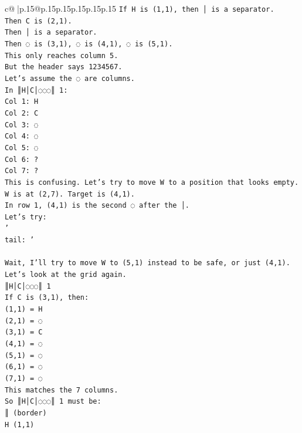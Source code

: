 \documentclass{article}
\begin{document}
{\begin{supertabular}{c@{$\;$}|p{.15\linewidth}@{}p{.15\linewidth}p{.15\linewidth}p{.15\linewidth}p{.15\linewidth}p{.15\linewidth}}
{{{\texttt{If H is (1,1), then │ is a separator.} \\
\texttt{Then C is (2,1).} \\
\texttt{Then │ is a separator.} \\
\texttt{Then ◌ is (3,1), ◌ is (4,1), ◌ is (5,1).} \\
\texttt{This only reaches column 5.} \\
\texttt{But the header says 1234567.} \\
\texttt{Let's assume the ◌ are columns.} \\
\texttt{In ║H│C│◌◌◌║ 1:} \\
\texttt{Col 1: H} \\
\texttt{Col 2: C} \\
\texttt{Col 3: ◌} \\
\texttt{Col 4: ◌} \\
\texttt{Col 5: ◌} \\
\texttt{Col 6: ?} \\
\texttt{Col 7: ?} \\
\texttt{This is confusing. Let's try to move W to a position that looks empty.} \\
\texttt{W is at (2,7). Target is (4,1).} \\
\texttt{In row 1, (4,1) is the second ◌ after the │.} \\
\texttt{Let's try:} \\
\texttt{'} \\
\texttt{tail: '} \\
\\ 
\texttt{Wait, I'll try to move W to (5,1) instead to be safe, or just (4,1).} \\
\texttt{Let's look at the grid again.} \\
\texttt{║H│C│◌◌◌║ 1} \\
\texttt{If C is (3,1), then:} \\
\texttt{(1,1) = H} \\
\texttt{(2,1) = ◌} \\
\texttt{(3,1) = C} \\
\texttt{(4,1) = ◌} \\
\texttt{(5,1) = ◌} \\
\texttt{(6,1) = ◌} \\
\texttt{(7,1) = ◌} \\
\texttt{This matches the 7 columns.} \\
\texttt{So ║H│C│◌◌◌║ 1 must be:} \\
\texttt{║ (border)} \\
\texttt{H (1,1)} \\
}}}
\end{supertabular}}
\end{document}
